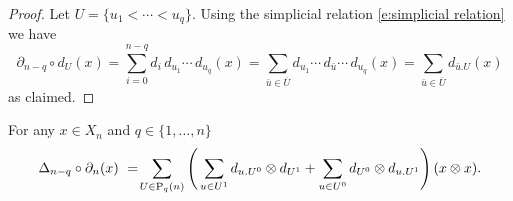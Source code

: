 \begin{proof}
	Let $U = \{u_1 < \cdots < u_q\}$. Using the simplicial relation \eqref{e:simplicial relation} we have
	\begin{equation*}
	\partial_{n-q} \circ d_U(x) = 
	\sum_{i=0}^{n-q} d_i\, d_{u_1} \cdots\, d_{u_q}(x) = 
	\sum_{\bar{u} \in \overline{U}} d_{u_1} \cdots\, d_{\bar{u}} \cdots\, d_{u_q}(x) =
	\sum_{\bar{u} \in \overline{U}} d_{\bar{u}.U}(x)
	\end{equation*}
	as claimed.
\end{proof}

\begin{lemma} \label{l:pigeon hole}
	For any $x \in X_n$ and $q \in \{1, \dots, n\}$
	\begin{equation} \label{e:pigeon hole 1}
	\Delta_{n-q} \circ \partial_n (x)\ =\! 
	\sum_{U \in \P_q(n)} \left( \,
	\sum_{u \in U^1} d_{u.U^0} \otimes d_{U^1} + 
	\sum_{u \in U^0} d_{U^0} \otimes d_{u.U^1} \right)(x \otimes x).
	\end{equation}
\end{lemma}

